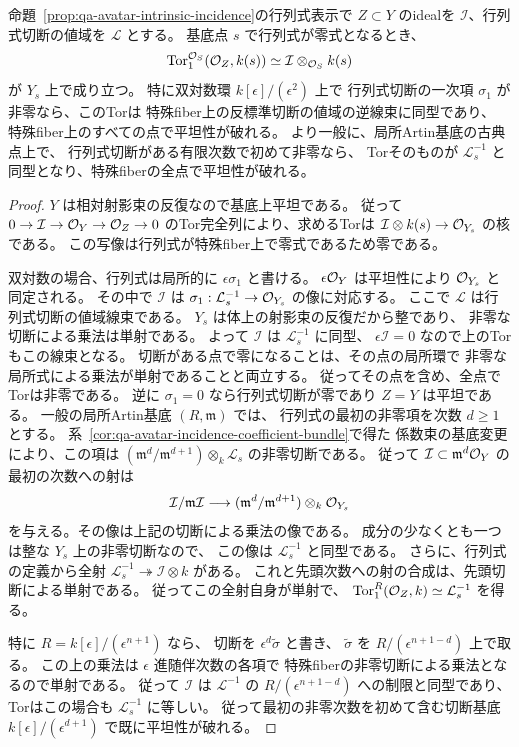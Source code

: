 \begin{corollary}[古典点における階数一表現の平坦性障害]
\label{cor:qa-avatar-incidence-classical-tor}
命題~\ref{prop:qa-avatar-intrinsic-incidence}の行列式表示で
$Z\subset Y$ のidealを $\mathcal I$、行列式切断の値域を $\mathcal L$ とする。
基底点 $s$ で行列式が零式となるとき、
\[
 \operatorname{Tor}^{\mathcal O_S}_1(\mathcal O_Z,k(s))
       \simeq \mathcal I\otimes_{\mathcal O_S}k(s)
\]
が $Y_s$ 上で成り立つ。
特に双対数環 $k[\epsilon]/(\epsilon^2)$ 上で
行列式切断の一次項 $\sigma_1$ が非零なら、このTorは
特殊fiber上の反標準切断の値域の逆線束に同型であり、
特殊fiber上のすべての点で平坦性が破れる。
より一般に、局所Artin基底の古典点上で、
行列式切断がある有限次数で初めて非零なら、
Torそのものが $\mathcal L_s^{-1}$ と同型となり、特殊fiberの全点で平坦性が破れる。
\end{corollary}
\begin{proof}
$Y$ は相対射影束の反復なので基底上平坦である。
従って $0\to\mathcal I\to\mathcal O_Y\to\mathcal O_Z\to0$
のTor完全列により、求めるTorは
$\mathcal I\otimes k(s)\to\mathcal O_{Y_s}$ の核である。
この写像は行列式が特殊fiber上で零式であるため零である。

双対数の場合、行列式は局所的に $\epsilon\sigma_1$ と書ける。
$\epsilon\mathcal O_Y$ は平坦性により $\mathcal O_{Y_s}$ と同定される。
その中で $\mathcal I$ は
$\sigma_1:\mathcal L_s^{-1}\to\mathcal O_{Y_s}$ の像に対応する。
ここで $\mathcal L$ は行列式切断の値域線束である。
$Y_s$ は体上の射影束の反復だから整であり、
非零な切断による乗法は単射である。
よって $\mathcal I$ は $\mathcal L_s^{-1}$ に同型、
$\epsilon\mathcal I=0$ なので上のTorもこの線束となる。
切断がある点で零になることは、その点の局所環で
非零な局所式による乗法が単射であることと両立する。
従ってその点を含め、全点でTorは非零である。
逆に $\sigma_1=0$ なら行列式切断が零であり $Z=Y$ は平坦である。
一般の局所Artin基底 $(R,\mathfrak m)$ では、
行列式の最初の非零項を次数 $d\ge1$ とする。
系~\ref{cor:qa-avatar-incidence-coefficient-bundle}で得た
係数束の基底変更により、この項は
$(\mathfrak m^d/\mathfrak m^{d+1})\otimes_k\mathcal L_s$
の非零切断である。
従って $\mathcal I\subset\mathfrak m^d\mathcal O_Y$ の
最初の次数への射は
\[
 \mathcal I/\mathfrak m\mathcal I\longrightarrow
 (\mathfrak m^d/\mathfrak m^{d+1})\otimes_k\mathcal O_{Y_s}
\]
を与える。その像は上記の切断による乗法の像である。
成分の少なくとも一つは整な $Y_s$ 上の非零切断なので、
この像は $\mathcal L_s^{-1}$ と同型である。
さらに、行列式の定義から全射
$\mathcal L_s^{-1}\twoheadrightarrow \mathcal I\otimes k$ がある。
これと先頭次数への射の合成は、先頭切断による単射である。
従ってこの全射自身が単射で、
$\operatorname{Tor}_1^R(\mathcal O_Z,k)\simeq\mathcal L_s^{-1}$ を得る。

特に $R=k[\epsilon]/(\epsilon^{n+1})$ なら、
切断を $\epsilon^d\widetilde\sigma$ と書き、
$\widetilde\sigma$ を $R/(\epsilon^{n+1-d})$ 上で取る。
この上の乗法は $\epsilon$ 進随伴次数の各項で
特殊fiberの非零切断による乗法となるので単射である。
従って $\mathcal I$ は $\mathcal L^{-1}$ の
$R/(\epsilon^{n+1-d})$ への制限と同型であり、
Torはこの場合も $\mathcal L_s^{-1}$ に等しい。
従って最初の非零次数を初めて含む切断基底
$k[\epsilon]/(\epsilon^{d+1})$ で既に平坦性が破れる。
\end{proof}

